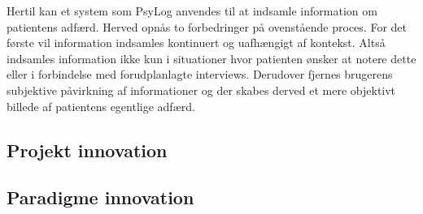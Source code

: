 Hertil kan et system som PsyLog anvendes til at indsamle information om patientens adfærd.
Herved opnås to forbedringer på ovenstående proces.
For det første vil information indsamles kontinuert og uafhængigt af kontekst.
Altså indsamles information ikke kun i situationer hvor patienten ønsker at notere dette eller i forbindelse med forudplanlagte interviews.
Derudover fjernes brugerens subjektive påvirkning af informationer og der skabes derved et mere objektivt billede af patientens egentlige adfærd.

\subsection{Projekt innovation}

\subsection{Paradigme innovation}
